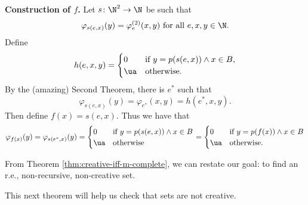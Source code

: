\documentclass[class=article, crop=false]{standalone}
\begin{document}
\begin{pf}
  \textbf{Construction of $f$.} Let $s\colon \N^2\to \N$ be such that
    \[
      \varphi_{s(e,x)}(y) = \varphi_e^{(2)}(x,y) \text{ for all } e,x,y \in \N.
    \]
  Define
    \[
      h(e,x,y) =
        \begin{cases}
          0 & \text{if } y = p(s(e,x)) \land x \in B, \\
          \ua & \text{otherwise}.
        \end{cases}
    \]
  By the (amazing) Second Theorem, there is $e^*$ such that
    \[
      \varphi_{s(e,x)}(y) = \varphi_{e^*}(x,y) = h(e^*,x,y).
    \]
  Then define $f(x) = s(e,x)$. Thus we have that
    \[
      \varphi_{f(x)}(y) = \varphi_{s(e^*,x)}(y) =
      \begin{cases}
        0 & \text{if } y = p(s(e,x)) \land x \in B \\
        \ua & \text{otherwise}
      \end{cases} =
      \begin{cases}
        0 & \text{if } y = p(f(x)) \land x \in B \\
        \ua & \text{otherwise}.
      \end{cases}
    \]
\end{pf}

From Theorem \ref{thm:creative-iff-m-complete}, we can restate our goal: to find an r.e., non-recursive, non-creative set.

This next theorem will help us check that sets are not creative.
\end{document}
